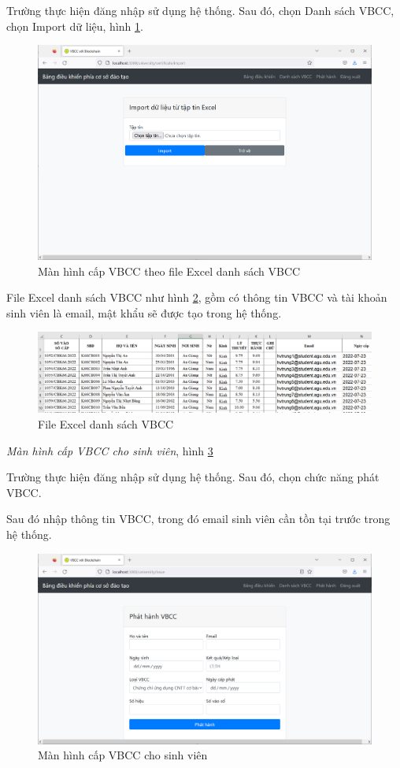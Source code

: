 Trường thực hiện đăng nhập sử dụng hệ thống. Sau đó, chọn Danh sách VBCC, chọn Import dữ liệu, hình \ref{fig:manhinh_importdulieu}.
\begin{figure}[H]
\centering
\includegraphics[width=.9\linewidth]{img/manhinh_importdulieu.PNG}
\caption{Màn hình cấp VBCC theo file Excel danh sách VBCC}
\label{fig:manhinh_importdulieu}
\end{figure}

File Excel danh sách VBCC như hình \ref{fig:excel}, gồm có thông tin VBCC và tài khoản sinh viên là email, mật khẩu sẽ được tạo trong hệ thống.

\begin{figure}[H]
\centering
\includegraphics[width=.9\linewidth]{img/excel.png}
\caption{File Excel danh sách VBCC}
\label{fig:excel}
\end{figure}

\emph{Màn hình cấp VBCC cho sinh viên}, hình \ref{fig:tt_phathanh}

Trường thực hiện đăng nhập sử dụng hệ thống. Sau đó, chọn chức năng phát VBCC. 

Sau đó nhập thông tin VBCC, trong đó email sinh viên cần tồn tại trước trong hệ thống.

\begin{figure}[H]
\centering
\includegraphics[width=.9\linewidth]{img/tt_phathanh.PNG}
\caption{Màn hình cấp VBCC cho sinh viên}
\label{fig:tt_phathanh}
\end{figure}

